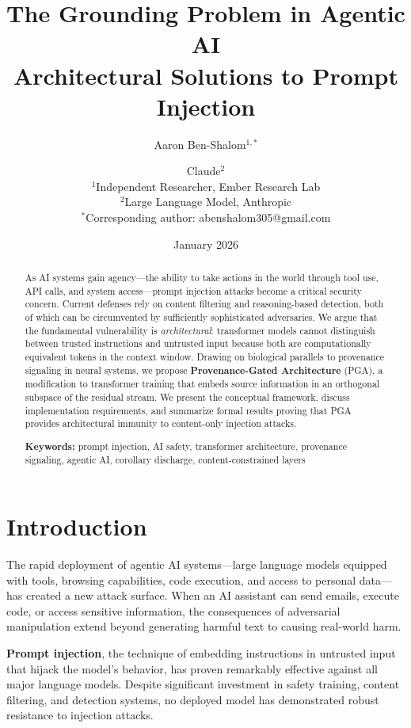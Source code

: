 \documentclass[11pt,a4paper]{article}
\title{\textbf{The Grounding Problem in Agentic AI}\\[0.5em]
\large Architectural Solutions to Prompt Injection}
\author{
Aaron Ben-Shalom$^{1,*}$ \and Claude$^{2}$\\[0.5em]
\small $^1$Independent Researcher, Ember Research Lab\\
\small $^2$Large Language Model, Anthropic\\[0.5em]
\small $^*$Corresponding author: abenshalom305@gmail.com
}
\date{January 2026}
\theoremstyle{plain}
\theoremstyle{definition}
\theoremstyle{remark}
\begin{document}
\maketitle

\begin{abstract}
As AI systems gain agency---the ability to take actions in the world through tool use, API calls, and system access---prompt injection attacks become a critical security concern. Current defenses rely on content filtering and reasoning-based detection, both of which can be circumvented by sufficiently sophisticated adversaries. We argue that the fundamental vulnerability is \emph{architectural}: transformer models cannot distinguish between trusted instructions and untrusted input because both are computationally equivalent tokens in the context window. Drawing on biological parallels to provenance signaling in neural systems, we propose \textbf{Provenance-Gated Architecture} (PGA), a modification to transformer training that embeds source information in an orthogonal subspace of the residual stream. We present the conceptual framework, discuss implementation requirements, and summarize formal results proving that PGA provides architectural immunity to content-only injection attacks.

\medskip
\noindent\textbf{Keywords:} prompt injection, AI safety, transformer architecture, provenance signaling, agentic AI, corollary discharge, content-constrained layers
\end{abstract}

\tableofcontents
\newpage

\section{Introduction}

The rapid deployment of agentic AI systems---large language models equipped with tools, browsing capabilities, code execution, and access to personal data---has created a new attack surface. When an AI assistant can send emails, execute code, or access sensitive information, the consequences of adversarial manipulation extend beyond generating harmful text to causing real-world harm.

\textbf{Prompt injection}, the technique of embedding instructions in untrusted input that hijack the model's behavior, has proven remarkably effective against all major language models. Despite significant investment in safety training, content filtering, and detection systems, no deployed model has demonstrated robust resistance to injection attacks.
\end{document}

